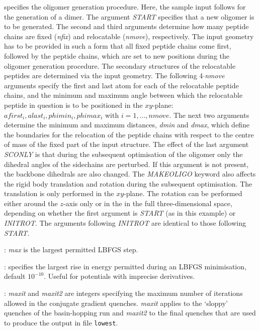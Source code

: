 specifies the oligomer generation procedure. Here, the sample input follows for the generation of a dimer.
The argument \textit{START} specifies that a new oligomer is to be generated.
The second and third arguments determine how many peptide chains are fixed ({\it nfix}) and relocatable ({\it nmove}), respectively.
The input geometry has
to be provided in such a form that all fixed peptide chains come first, followed by the peptide chains,
which are set to
new positions during the oligomer generation procedure. The secondary structures of the relocatable peptides are determined via the input
geometry. The following 4$\cdot${\it nmove} arguments specify the first and last atom for each of the relocatable peptide chains, and the
minimum and maximum angle between which the relocatable peptide in question is to be positioned in the $xy$-plane:
$afirst_i, alast_i, phimin_i, phimax_i$ with $i=1,\ldots,nmove$.
The next two arguments determine the minimum and maximum distances, {\it dmin} and {\it dmax}, which define the boundaries
for the relocation of the peptide chains with respect to the centre of mass of the fixed part of the input structure.
The effect of the last argument \textit{SCONLY} is that during the subsequent optimisation of the oligomer only the dihedral angles
of the sidechains are perturbed. If this argument is not present, the backbone dihedrals are also changed.
The \textit{MAKEOLIGO} keyword also affects the rigid body translation and rotation during the subsequent optimisation. The translation is
only performed in the $xy$-plane. The rotation can be performed either around the $z$-axis only or in the in the full three-dimensional
space, depending on whether the first argument is \textit{START} (as in this example) or \textit{INITROT}. The arguments following
\textit{INITROT} are identical to those following \textit{START}.

: {\it max\/} is the largest permitted LBFGS step.

: specifies the largest rise in energy permitted during an LBFGS 
minimisation, default $10^{-10}$. Useful for potentials with imprecise derivatives. 

: {\it maxit\/} and {\it maxit2\/} are integers specifying the
maximum number of iterations allowed in the conjugate gradient quenches. {\it maxit\/} applies
to the `sloppy' quenches of the basin-hopping run and {\it maxit2\/} to the final quenches
that are used to produce the output in file {\tt lowest}.


